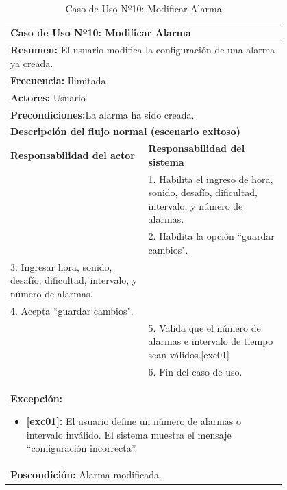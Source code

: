 \begin{table}[H]
    \centering
    \caption{Caso de Uso Nº10: Modificar Alarma}
    \vspace{10pt}
    
    \begin{tabular}{| p{0.4\linewidth} | p{0.4\linewidth} |}
        \hline
        \multicolumn{2}{|l|}{\textbf{Caso de Uso Nº10:} Modificar Alarma} \\
        \hline
        \multicolumn{2}{|l|}{\textbf{Resumen:} El usuario modifica la configuración de una alarma ya creada.} \\
        \hline
        \multicolumn{2}{|l|}{\textbf{Frecuencia:}  Ilimitada} \\
        \hline
        \multicolumn{2}{|l|}{\textbf{Actores:}  Usuario} \\
        \hline
        \multicolumn{2}{|l|}{\textbf{Precondiciones:}La alarma ha sido creada.} \\
        \hline
        \multicolumn{2}{|l|}{\textbf{Descripción del flujo normal (escenario exitoso)} } \\
        \hline
        \textbf{Responsabilidad del actor} & \textbf{Responsabilidad del sistema}\\
            & 1. Habilita el ingreso de hora, sonido, desafío, dificultad, intervalo, y número de alarmas.\\
            & 2. Habilita la opción ``guardar cambios". \\
             3. Ingresar hora, sonido, desafío, dificultad, intervalo, y número de alarmas. &\\
            4. Acepta ``guardar cambios". &\\
            & 5. Valida que el número de alarmas e intervalo de tiempo sean válidos.[exc01] \\
            & 6. Fin del caso de uso. \\
        \hline
        \multicolumn{2}{|p{0.8\linewidth}|}{
                \textbf{Excepción:}
                \begin{itemize}
                    \item \textbf{[exc01]:}  El usuario define un número de alarmas o intervalo inválido. El sistema muestra el mensaje ``configuración incorrecta”.
                \end{itemize}}\\
        \hline
        \multicolumn{2}{|l|}{\textbf{Poscondición:}  Alarma modificada.} \\
        \hline
    \end{tabular}

    \label{table:10}
\end{table}

